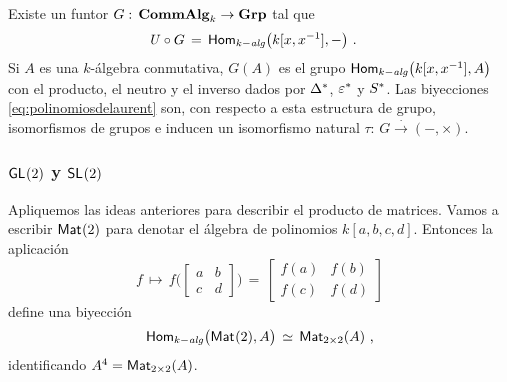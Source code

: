 \begin{coroMultiplicativo}\label{coro:multiplicativo}
	Existe un funtor $G:\,\CommAlg[k]\rightarrow\Grp$ tal que
	\begin{align*}
		\olvido\circ G & \,=\,\Homalg\big(k[x,x^{-1}],-\big)
		\text{ .}
	\end{align*}
	Si $A$ es una $k$-\'{a}lgebra conmutativa, $G(A)$ es el grupo
	$\Homalg\big(k[x,x^{-1}],A\big)$ con el producto, el neutro y el
	inverso dados por $\pull\Delta$, $\pull\varepsilon$ y $\pull S$.
	Las biyecciones \eqref{eq:polinomiosdelaurent} son, con respecto a esta
	estructura de grupo, isomorfismos de grupos e inducen un isomorfismo
	natural $\tau:\,G\xrightarrow\cdot (-,\times)$.
\end{coroMultiplicativo}

\subsubsection{$\GL(2)$ y $\SL(2)$}

Apliquemos las ideas anteriores para describir el producto de matrices. Vamos a
escribir $\MM(2)$ para denotar el \'{a}lgebra de polinomios $k[a,b,c,d]$.
Entonces la aplicaci\'{o}n
\begin{equation}
	\label{eq:morfismoenmatriz}
	f\,\mapsto\,f\Big(
		\begin{bmatrix} a & b \\ c & d \end{bmatrix}\Big)\,=\,
		\begin{bmatrix}	f(a) & f(b) \\ f(c) & f(d) \end{bmatrix}
\end{equation}
%
define una biyecci\'{o}n
\begin{equation}
	\label{eq:morfismosdesdematrices}
	\Homalg\big(\MM(2),A\big) \,\simeq\,\MM[2\times 2](A)
	\text{ ,}
\end{equation}
%
identificando $A^4=\MM[2\times 2](A)$.

